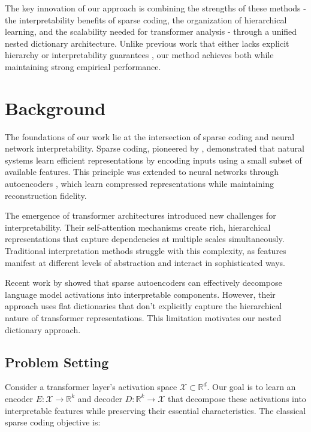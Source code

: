 \documentclass{article} %
\begin{document}
The key innovation of our approach is combining the strengths of these methods - the interpretability benefits of sparse coding, the organization of hierarchical learning, and the scalability needed for transformer analysis - through a unified nested dictionary architecture. Unlike previous work that either lacks explicit hierarchy \cite{Cunningham2023SparseAF} or interpretability guarantees \cite{Lee2011UnsupervisedLO}, our method achieves both while maintaining strong empirical performance.

\section{Background}
\label{sec:background}

The foundations of our work lie at the intersection of sparse coding and neural network interpretability. Sparse coding, pioneered by \cite{Olshausen1996EmergenceOS}, demonstrated that natural systems learn efficient representations by encoding inputs using a small subset of available features. This principle was extended to neural networks through autoencoders \cite{goodfellow2016deep}, which learn compressed representations while maintaining reconstruction fidelity.

The emergence of transformer architectures \cite{vaswani2017attention} introduced new challenges for interpretability. Their self-attention mechanisms create rich, hierarchical representations that capture dependencies at multiple scales simultaneously. Traditional interpretation methods struggle with this complexity, as features manifest at different levels of abstraction and interact in sophisticated ways.

Recent work by \cite{Cunningham2023SparseAF} showed that sparse autoencoders can effectively decompose language model activations into interpretable components. However, their approach uses flat dictionaries that don't explicitly capture the hierarchical nature of transformer representations. This limitation motivates our nested dictionary approach.

\subsection{Problem Setting}
\label{subsec:problem}

Consider a transformer layer's activation space $\mathcal{X} \subset \mathbb{R}^d$. Our goal is to learn an encoder $E: \mathcal{X} \rightarrow \mathbb{R}^k$ and decoder $D: \mathbb{R}^k \rightarrow \mathcal{X}$ that decompose these activations into interpretable features while preserving their essential characteristics. The classical sparse coding objective is:
\end{document}
